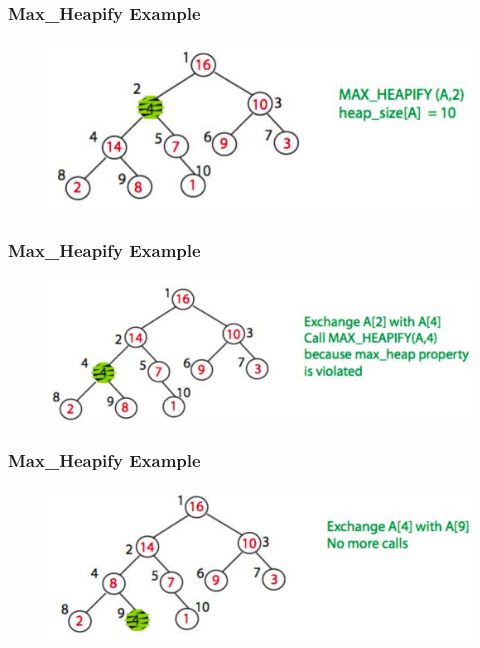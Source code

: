 \documentclass[11pt]{beamer}
\begin{document}
\begin{frame}
	\frametitle	{Max\_Heapify Example} 
	\begin{figure}
		\centering
		\includegraphics[width=1\linewidth]{"Screenshot 2020-12-23 at 9.03.40 PM"}
		\label{fig:screenshot-2020-12-23-at-9}
	\end{figure}
	
\end{frame}

\begin{frame}
	\frametitle	{Max\_Heapify Example} 
	\begin{figure}
		\centering
		\includegraphics[width=1\linewidth]{"Screenshot 2020-12-23 at 9.03.53 PM"}
		\label{fig:screenshot-2020-12-23-at-9}
	\end{figure}	
\end{frame}

\begin{frame}
	\frametitle	{Max\_Heapify Example} 
	\begin{figure}
		\centering
		\includegraphics[width=1\linewidth]{"Screenshot 2020-12-23 at 9.04.07 PM"}
		\label{fig:screenshot-2020-12-23-at-9}
	\end{figure}	
\end{frame}
\end{document}

